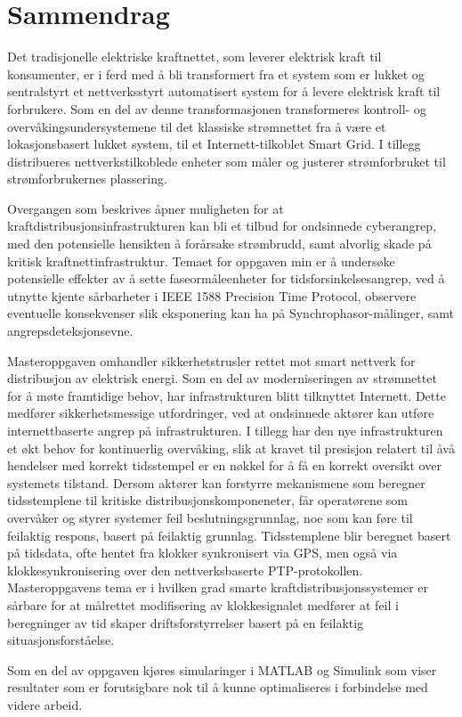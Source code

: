 \chapter*{Sammendrag}

Det tradisjonelle elektriske kraftnettet, som leverer elektrisk kraft til konsumenter, er i ferd med å bli transformert fra et system som er lukket og sentralstyrt et nettverksstyrt automatisert system for å levere elektrisk kraft til forbrukere.
Som en del av denne transformasjonen transformeres kontroll- og overvåkingsundersystemene til det klassiske strømnettet fra å være et lokasjonsbasert lukket system, til et Internett-tilkoblet Smart Grid. I tillegg distribueres nettverkstilkoblede enheter som måler og justerer strømforbruket til strømforbrukernes plassering.

Overgangen som beskrives åpner muligheten for at kraftdistribusjonsinfrastrukturen kan bli et tilbud for ondsinnede cyberangrep, med den potensielle hensikten å forårsake strømbrudd, samt alvorlig skade på kritisk kraftnettinfrastruktur. Temaet for oppgaven min er å undersøke potensielle effekter av å sette faseormåleenheter for tidsforsinkelsesangrep, ved å utnytte kjente sårbarheter i IEEE 1588 Precision Time Protocol, observere eventuelle konsekvenser slik eksponering kan ha på Synchrophasor-målinger, samt angrepsdeteksjonsevne.

Masteroppgaven omhandler sikkerhetstrusler rettet mot smart nettverk for distribusjon av elektrisk energi. Som en del av moderniseringen av strømnettet for å møte framtidige behov, har infrastrukturen blitt tilknyttet Internett. Dette medfører sikkerhetsmessige utfordringer, ved at ondsinnede aktører kan utføre internettbaserte angrep på infrastrukturen. I tillegg har den nye infrastrukturen et økt behov for kontinuerlig overvåking, slik at kravet til presisjon relatert til åvå hendelser med korrekt tidsstempel er en nøkkel for å få en korrekt oversikt over systemets tilstand. Dersom aktører kan forstyrre mekanismene som beregner tidsstemplene til kritiske distribusjonskomponeneter, får operatørene som overvåker og styrer systemer feil beslutningsgrunnlag, noe som kan føre til feilaktig respons, basert på feilaktig grunnlag. Tidsstemplene blir beregnet basert på tidsdata, ofte hentet fra klokker synkronisert via GPS, men også via klokkesynkronisering over den nettverksbaserte PTP-protokollen. Masteroppgavens tema er i hvilken grad smarte kraftdistribusjonssystemer er sårbare for at målrettet modifisering av klokkesignalet medfører at feil i beregninger av tid skaper driftsforstyrrelser basert på en feilaktig situasjonsforståelse.

Som en del av oppgaven kjøres simularinger i MATLAB og Simulink som viser resultater som er forutsigbare nok til å kunne optimaliseres i forbindelse med  videre arbeid.

